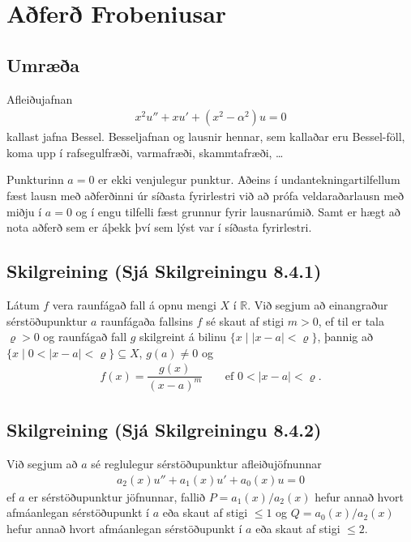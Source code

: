\documentclass[a4paper,10pt,icelandic]{sphinxmanual}
\begin{document}
\section{Aðferð Frobeniusar}
\label{\detokenize{Kafli08:afer-frobeniusar}}

\subsection{Umræða}
\label{\detokenize{Kafli08:umraea}}
Afleiðujafnan
\begin{equation*}
\begin{split}x^2u''+xu'+(x^2-\alpha^2)u=0\end{split}
\end{equation*}
kallast jafna Bessel. Besseljafnan og lausnir hennar, sem kallaðar eru Bessel-föll, koma upp í rafsegulfræði, varmafræði, skammtafræði, …

Punkturinn \(a=0\) er ekki venjulegur punktur. Aðeins í undantekningartilfellum fæst lausn með aðferðinni úr síðasta fyrirlestri við að prófa veldaraðarlausn með miðju í \(a=0\) og í engu tilfelli fæst grunnur fyrir lausnarúmið. Samt er hægt að nota aðferð sem er áþekk því sem lýst var í síðasta fyrirlestri.


\subsection{Skilgreining (Sjá Skilgreiningu 8.4.1)}
\label{\detokenize{Kafli08:skilgreining-sja-skilgreiningu-8-4-1}}
Látum \(f\) vera raunfágað fall á opnu mengi \(X\) í \(\mathbb{R}\). Við segjum að einangraður sérstöðupunktur \(a\) raunfágaða fallsins \(f\) sé skaut af stigi \(m>0\), ef til er tala \(\varrho>0\) og raunfágað fall \(g\) skilgreint á bilinu \(\{x\mid |x-a|<\varrho\}\), þannig að \(\{x\mid 0<|x-a|<{\varrho}\}\subseteq X\), \(g(a)\neq 0\) og
\begin{equation*}
\begin{split}f(x)=\dfrac {g(x)}{(x-a)^m}\qquad \mbox{ef }0<|x-a|<\varrho.\end{split}
\end{equation*}

\subsection{Skilgreining (Sjá Skilgreiningu 8.4.2)}
\label{\detokenize{Kafli08:skilgreining-sja-skilgreiningu-8-4-2}}
Við segjum að \(a\) sé reglulegur sérstöðupunktur afleiðujöfnunnar
\begin{equation*}
\begin{split}a_2(x)u''+a_1(x)u'+a_0(x)u=0\end{split}
\end{equation*}
ef \(a\) er sérstöðupunktur jöfnunnar, fallið \(P=a_1(x)/a_2(x)\) hefur annað hvort afmáanlegan sérstöðupunkt í \(a\) eða skaut af stigi \(\leq 1\) og \(Q=a_0(x)/a_2(x)\) hefur annað hvort afmáanlegan sérstöðupunkt í \(a\) eða skaut af stigi \(\leq 2\).
\end{document}
